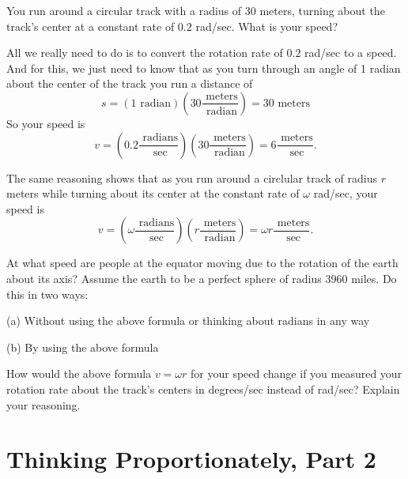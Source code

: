 \documentclass{ximera}
\begin{document}
\begin{question}  \label{Q2675: Angles}
You run around a circular track with a radius of $30$ meters, turning about the track's center at a constant rate of $0.2$ rad/sec. What is your speed?

\begin{explanation}
All we really need to do is to convert the rotation rate of $0.2$ rad/sec to a speed. And for this, we just need to know that 
as you turn through an angle of 1 radian about the center of the track you run a distance of 
\[
     s = (1 \text{ radian}) \left( 30 \frac{\text{ meters}}{\text{ radian}}\right) = 30 \text{ meters}
\]
So your speed is
\[
   v = \left( 0.2 \frac{\text{ radians}}{\text{ sec}}\right) \left( 30 \frac{\text{ meters}}{\text{ radian}}\right) = 6 \frac{\text{ meters}}{\text{ sec}}.
\]

The same reasoning shows that as you run around a circlular track of radius $r$ meters while turning about its center at the constant rate of $\omega$ rad/sec, your speed is
\[
   v = \left( \omega \frac{\text{ radians}}{\text{ sec}}\right) \left( r \frac{\text{ meters}}{\text{ radian}}\right) = \omega r \frac{\text{ meters}}{\text{ sec}}.
\]


\end{explanation}
\end{question}


\begin{question}  \label{Q255: Angles}
At what speed are people at the equator moving due to the rotation of the earth about its axis? Assume the earth to be a perfect sphere of radius $3960$ miles. Do this in two ways:

(a) Without using the above formula or thinking about radians in any way

(b) By using the above formula

\end{question}



\begin{question}  \label{Q2455: Angles}
How would the above formula $v=\omega r$ for your speed change if you measured your rotation rate about the track's centers in degrees/sec instead of rad/sec? Explain your reasoning.

\end{question}



\section{Thinking Proportionately, Part 2}
\end{document}
